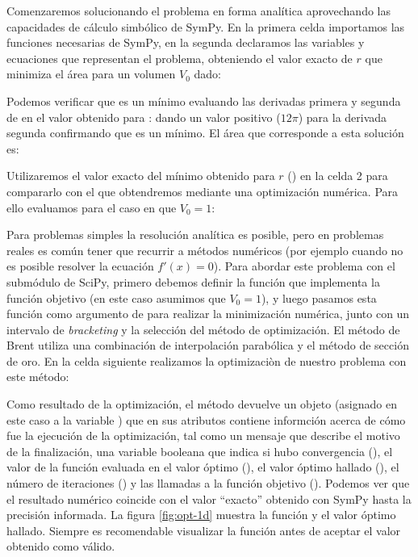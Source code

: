 Comenzaremos solucionando el problema en forma analítica aprovechando las capacidades de cálculo simbólico de SymPy. En la primera celda importamos las funciones necesarias de SymPy, en la segunda declaramos las variables y ecuaciones que representan el problema, obteniendo el valor exacto de $r$ que minimiza el área para un volumen $V_0$ dado:

Podemos verificar que es un mínimo evaluando las derivadas primera y segunda de  en el valor obtenido para :
\noindent dando un valor positivo ($12 \pi$) para la derivada segunda confirmando que  es un mínimo. El área que corresponde a esta solución es:

Utilizaremos el valor exacto del mínimo obtenido para $r$ () en la celda 2 para compararlo con el que obtendremos mediante una optimización numérica. Para ello evaluamos  para el caso en que $V_0 = 1$: 

Para problemas simples la resolución analítica es posible, pero en problemas reales es común tener que recurrir a métodos numéricos (por ejemplo cuando no es posible resolver la ecuación $f'(x) = 0$). Para abordar este problema con el submódulo  de SciPy, primero debemos definir la función  que implementa la función objetivo (en este caso asumimos que $V_0 = 1$), y luego pasamos esta función como argumento de  para realizar la minimización numérica, junto con un intervalo de \textit{bracketing} y la selección del método de optimización. El método de Brent utiliza una combinación de interpolación parabólica y el método de sección de oro. En la celda siguiente realizamos la optimizaciòn de nuestro problema con este método:


Como resultado de la optimización, el método devuelve un objeto (asignado en este caso a la variable ) que en sus atributos contiene informción acerca de cómo fue la ejecución de la optimización, tal como un mensaje que describe el motivo de la finalización, una variable booleana que indica si hubo convergencia (), el valor de la función evaluada en el valor óptimo (), el valor óptimo hallado (), el número de iteraciones () y las llamadas a la función objetivo (). Podemos ver que el resultado numérico coincide con el valor ``exacto'' obtenido con SymPy hasta la precisión informada. La figura \ref{fig:opt-1d} muestra la función y el valor óptimo hallado. Siempre es recomendable visualizar la función antes de aceptar el valor obtenido como válido.


